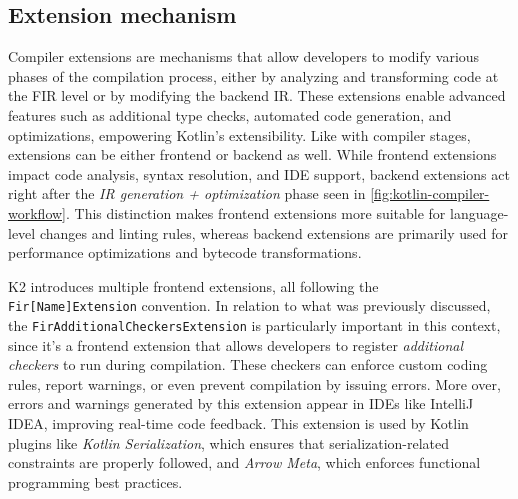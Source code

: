 \documentclass[12pt,a4paper,openright,twoside]{book}
\begin{document}
\subsection{Extension mechanism}

Compiler extensions are mechanisms that allow developers to modify various
phases of the compilation process, either by analyzing and transforming code at
the \ac{FIR} level or by modifying the backend \ac{IR}. These extensions
enable advanced features such as additional type checks, automated code
generation, and optimizations, empowering Kotlin’s extensibility.
%
Like with compiler stages, extensions can be either frontend or backend as well.
While frontend extensions impact code analysis, syntax resolution, and IDE
support, backend extensions act right after the \emph{IR generation +
optimization} phase seen in \cref{fig:kotlin-compiler-workflow}. This
distinction makes frontend extensions more suitable for language-level changes
and linting rules, whereas backend extensions are primarily used for performance
optimizations and bytecode transformations.

K2 introduces multiple frontend extensions, all following the
\lstinline{Fir[Name]Extension} convention. In relation to what was previously
discussed, the \lstinline{FirAdditionalCheckersExtension} is particularly
important in this context, since it's a frontend extension that allows
developers to register \emph{additional checkers} to run during compilation.
These checkers can enforce custom coding rules, report warnings, or even prevent
compilation by issuing errors. More over, errors and warnings generated by this
extension appear in IDEs like IntelliJ IDEA, improving real-time code feedback.
This extension is used by Kotlin plugins like \emph{Kotlin Serialization},
which ensures that serialization-related constraints are properly followed, and
\emph{Arrow Meta}, which enforces functional programming best practices.
\end{document}
